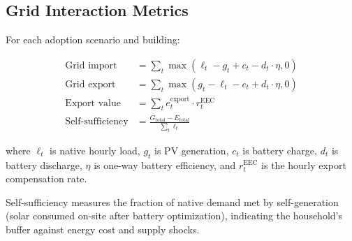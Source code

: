 \documentclass[11pt]{article}
\begin{document}
\subsection{Grid Interaction Metrics}

For each adoption scenario and building:

\begin{align}
\text{Grid import} &= \sum_t \max(\ell_t - g_t + c_t - d_t \cdot \eta, 0) \label{eq:grid_import} \\
\text{Grid export} &= \sum_t \max(g_t - \ell_t - c_t + d_t \cdot \eta, 0) \label{eq:grid_export} \\
\text{Export value} &= \sum_t e_t^{\text{export}} \cdot r_t^{\text{EEC}} \label{eq:export_value} \\
\text{Self-sufficiency} &= \frac{G_{\text{total}} - E_{\text{total}}}{\sum_t \ell_t} \label{eq:self_sufficiency}
\end{align}

where $\ell_t$ is native hourly load, $g_t$ is PV generation, $c_t$ is battery charge, $d_t$ is battery discharge, $\eta$ is one-way battery efficiency, and $r_t^{\text{EEC}}$ is the hourly export compensation rate.

Self-sufficiency measures the fraction of native demand met by self-generation (solar consumed on-site after battery optimization), indicating the household's buffer against energy cost and supply shocks.
\end{document}
